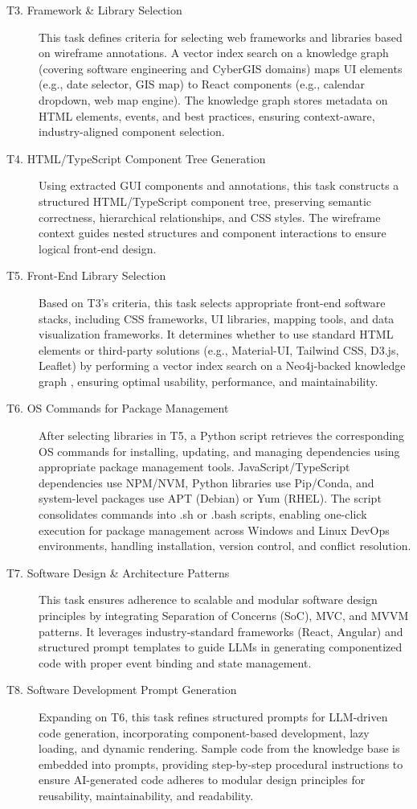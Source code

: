 \begin{description}
\item[T3. Framework \& Library Selection]
This task defines criteria for selecting web frameworks and libraries based on wireframe annotations. A vector index search on a knowledge graph (covering software engineering and CyberGIS domains) maps UI elements (e.g., date selector, GIS map) to React components (e.g., calendar dropdown, web map engine). The knowledge graph stores metadata on HTML elements, events, and best practices, ensuring context-aware, industry-aligned component selection.

\item[T4. HTML/TypeScript Component Tree Generation]
Using extracted GUI components and annotations, this task constructs a structured HTML/TypeScript component tree, preserving semantic correctness, hierarchical relationships, and CSS styles. The wireframe context guides nested structures and component interactions to ensure logical front-end design.

\item[T5. Front-End Library Selection]
Based on T3's criteria, this task selects appropriate front-end software stacks, including CSS frameworks, UI libraries, mapping tools, and data visualization frameworks. It determines whether to use standard HTML elements or third-party solutions (e.g., Material-UI, Tailwind CSS, D3.js, Leaflet) by performing a vector index search on a Neo4j-backed knowledge graph \citep{xu2024automating}, ensuring optimal usability, performance, and maintainability.

\item[T6. OS Commands for Package Management]
After selecting libraries in T5, a Python script retrieves the corresponding OS commands for installing, updating, and managing dependencies using appropriate package management tools. JavaScript/TypeScript dependencies use NPM/NVM, Python libraries use Pip/Conda, and system-level packages use APT (Debian) or Yum (RHEL). The script consolidates commands into .sh or .bash scripts, enabling one-click execution for package management across Windows and Linux DevOps environments, handling installation, version control, and conflict resolution.

\item[T7. Software Design \& Architecture Patterns]
This task ensures adherence to scalable and modular software design principles by integrating Separation of Concerns (SoC), MVC, and MVVM patterns. It leverages industry-standard frameworks (React, Angular) and structured prompt templates to guide LLMs in generating componentized code with proper event binding and state management.

\item[T8. Software Development Prompt Generation]
Expanding on T6, this task refines structured prompts for LLM-driven code generation, incorporating component-based development, lazy loading, and dynamic rendering. Sample code from the knowledge base is embedded into prompts, providing step-by-step procedural instructions to ensure AI-generated code adheres to modular design principles for reusability, maintainability, and readability.
\end{description}

